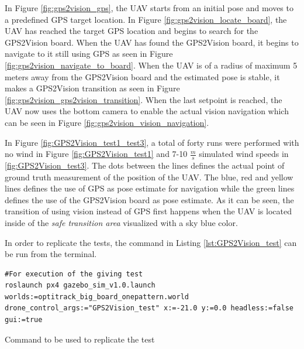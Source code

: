 \documentclass[../Head/report.tex]{subfiles}
\begin{document}
In Figure \ref{fig:gps2vision_gps}, the UAV starts from an initial pose and moves to a predefined GPS target location. In Figure \ref{fig:gps2vision_locate_board}, the UAV has reached the target GPS location and begins to search for the GPS2Vision board. When the UAV has found the GPS2Vision board, it begins to navigate to it still using GPS as seen in Figure \ref{fig:gps2vision_navigate_to_board}. When the UAV is of a radius of maximum 5 meters away from the GPS2Vision board and the estimated pose is stable, it makes a GPS2Vision transition as seen in Figure \ref{fig:gps2vision_gps2vision_transition}. When the last setpoint is reached, the UAV now uses the bottom camera to enable the actual vision navigation which can be seen in Figure \ref{fig:gps2vision_vision_navigation}. 

In Figure \ref{fig:GPS2Vision_test1_test3}, a total of forty runs were performed with no wind in Figure \ref{fig:GPS2Vision_test1} and 7-10 $\frac{m}{s}$ simulated wind speeds in \ref{fig:GPS2Vision_test3}. The dots between the lines defines the actual point of ground truth measurement of the position of the UAV. The blue, red and yellow lines defines the use of GPS as pose estimate for navigation while the green lines defines the use of the GPS2Vision board as pose estimate. As it can be seen, the
transition of using vision instead of GPS first happens when the UAV is located inside of the \textit{safe transition area} visualized with a sky blue color. 

In order to replicate the tests, the command in Listing \ref{lst:GPS2Vision_test} can be run from the terminal.

\begin{listing}[H] 
\begin{tcolorbox}[
    enhanced,
    attach boxed title to top left={xshift=6mm,yshift=-3mm},
    colback=lightgreen!20,
    colframe=lightgreen,
    fonttitle=\bfseries\color{black},
]
\begin{verbatim}
#For execution of the giving test
roslaunch px4 gazebo_sim_v1.0.launch worlds:=optitrack_big_board_onepattern.world drone_control_args:="GPS2Vision_test" x:=-21.0 y:=0.0 headless:=false gui:=true
\end{verbatim}
\end{tcolorbox}
\caption{Command to be used to replicate the test}
\label{lst:GPS2Vision_test}    
\end{listing} 
\end{document}
